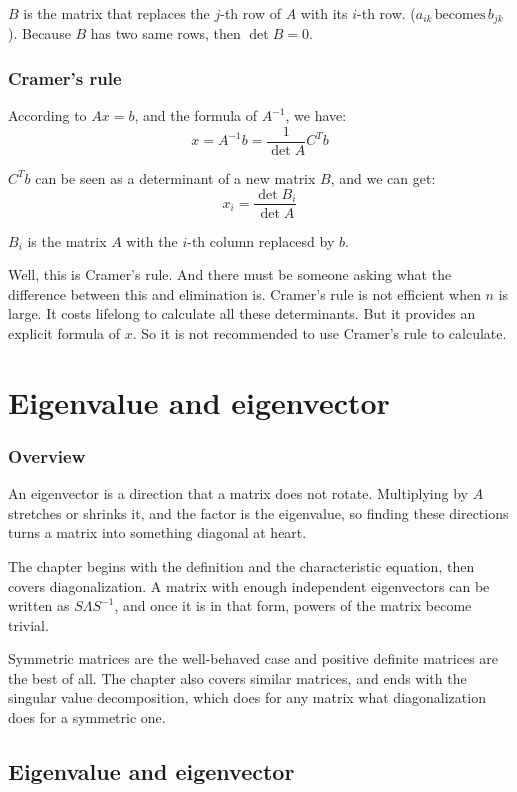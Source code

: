 \documentclass[10pt,a4paper,oneside,numbers=noenddot]{scrbook}
\theoremstyle{ctplain}
\theoremstyle{ctresult}
\begin{document}
$B$ is the matrix that replaces the $j$-th row of $A$ with its $i$-th row. ($a_{ik} \,
\text{becomes} \, b_{jk}$). Because $B$ has two same rows, then $\det B = 0$.

\subsection{Cramer's rule}

According to $Ax = b$, and the formula of $A^{-1}$, we have:
\[
  x = A^{-1}b = \frac{1}{\det A} C^{T}b
\]

$C^{T}b$ can be seen as a determinant of a new matrix $B$, and we can get:
\[
  x_i = \frac{\det B_i}{\det A}
\]

$B_i$ is the matrix $A$ with the $i$-th column replacesd by $b$.

Well, this is Cramer's rule. And there must be someone asking what the difference
between this and elimination is. Cramer's rule is not efficient when $n$ is large. It
costs lifelong to calculate all these determinants. But it provides an explicit formula of
$x$. So it is not recommended to use Cramer's rule to calculate.

\chapter{Eigenvalue and eigenvector}

\subsection*{Overview}

An eigenvector is a direction that a matrix does not rotate. Multiplying by $A$ stretches
or shrinks it, and the factor is the eigenvalue, so finding these directions turns a matrix
into something diagonal at heart.

The chapter begins with the definition and the characteristic equation, then covers
diagonalization. A matrix with enough independent eigenvectors can be written as
$S \Lambda S^{-1}$, and once it is in that form, powers of the matrix become trivial.

Symmetric matrices are the well-behaved case and positive definite matrices are the best of
all. The chapter also covers similar matrices, and ends with the singular value
decomposition, which does for any matrix what diagonalization does for a symmetric one.


\section{Eigenvalue and eigenvector}
\end{document}
